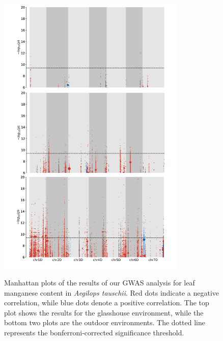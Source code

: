 \documentclass[12pt, letterpaper, ]{report}
\begin{document}
\begin{figure}[h]
        \centering
        \includegraphics[width = 0.8\textwidth]{images/gwas_plots/svgtopng/mn_manhattan_plot.png}
        \label{Fig:mn_peak_plot}
        \caption{Manhattan plots of the results of our GWAS analysis for leaf manganese content in \textit{Aegilops tauschii}. Red dots indicate a negative correlation, while blue dots denote a positive correlation. The top plot shows the results for the glasshouse environment, while the bottom two plots are the outdoor environments. The dotted line represents the bonferroni-corrected significance threshold.}
\end{figure}
        
\end{document}
